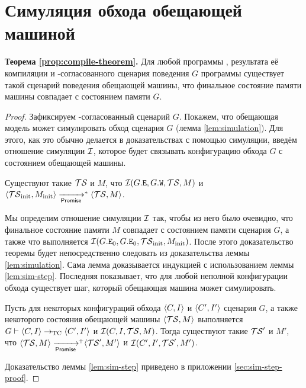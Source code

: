 \section{Симуляция обхода обещающей машиной}
\label{sec:simulation} 
\noindent
{\bf Теорема \ref {prop:compile-theorem}.}
  Для любой программы \Prog, результата её компиляции \ProgARM и \ARM-согласованного
  сценария поведения $G$ программы
  \ProgARM существует такой сценарий поведения обещающей машины, что 
  финальное состояние памяти машины совпадает с состоянием памяти $G$.
\begin{proof}
  Зафиксируем \ARM-согласованный сценарий $G$.
Покажем, что обещающая модель может симулировать
  обход сценария $G$ (лемма \ref{lem:simulation}).
 Для этого, как это обычно делается в доказательствах с помощью симуляции, введём
  отношение симуляции $\mathcal{I}$, которое будет связывать конфигурацию обхода $G$ с состоянием обещающей машины.
  
\begin{lemma}
  \label{lem:simulation}
  Существуют такие $\mathcal{TS}$ и $M$, что $\mathcal{I}(G.{\mathtt{E}}, G.{\mathtt{W}}, \mathcal{TS}, M)$ и
  $\tup{\TSf_{\rm init}, M_{\rm init}} \stepp^{*} \tup{\TSf, M}$.
\end{lemma}
  Мы определим отношение симуляции $\mathcal{I}$ так, чтобы из него было очевидно, что финальное состояние памяти
  $M$ совпадает с состоянием памяти сценария $G$, а также что выполняется $\mathcal{I}(G.{\mathtt{E}}_0, G.{\mathtt{E}}_0, \mathcal{TS}_{\rm init}, M_{\rm init})$.
   После этого доказательство теоремы будет непосредственно следовать из доказательства леммы \ref{lem:simulation}.
Сама лемма доказывается индукцией с использованием леммы \ref{lem:sim-step}. Последняя показывает,
  что для любой неполной конфигурации обхода существует шаг, который обещающая машина может симулировать. 
\begin{lemma}
  \label{lem:sim-step}
  Пусть для некоторых конфигураций обхода ${\langle{C, I}\rangle}$ и ${\langle{C', I'}\rangle}$ сценария $G$,
  а также некоторого состояния обещающей машины ${\langle{\ensuremath{\mathcal{TS}}, M}\rangle}$ выполняется
  $G \vdash {\langle{C, I}\rangle} \rightarrow_{\rm TC} {\langle{C', I'}\rangle}$ и
  $\mathcal{I}(C, I, \mathcal{TS}, M)$.
  Тогда существуют такие $\mathcal{TS}'$ и $M'$, что $\tup{\TSf, M} \stepp\!\!^{+} \tup{\TSf', M'}$ и
  $\mathcal{I}(C', I', \mathcal{TS}', M')$.
\end{lemma}
\noindent Доказательство леммы \ref{lem:sim-step} приведено в приложении \ref{sec:sim-step-proof}.
\end{proof}
  
